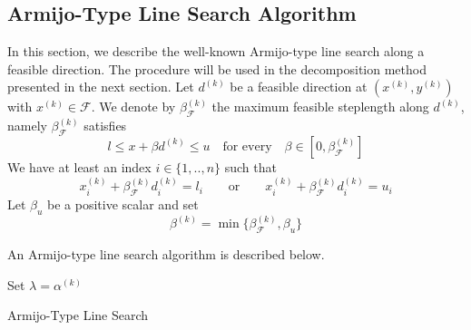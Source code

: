 \subsection{Armijo-Type Line Search Algorithm}
In this section, we describe the well-known Armijo-type line search along a feasible direction. The procedure will be used in the decomposition method presented in the next section. Let $d^{(k)}$ be a feasible direction at $(x^{(k)}, y^{(k)})$ with $x^{(k)} \in \mathcal{F}$. We denote by $\beta_{\mathcal{F}}^{(k)}$ the maximum feasible steplength along $d^{(k)}$, namely $\beta_{\mathcal{F}}^{(k)}$ satisfies
\begin{equation*}
l \leq x + \beta d^{(k)} \leq u \quad \text{for every} \quad \beta \in [ 0, \beta_{\mathcal{F}}^{(k)} ]
\end{equation*}
We have at least an index $i \in \{1, .., n\}$ such that
\begin{equation*}
x_i^{(k)} + \beta_{\mathcal{F}}^{(k)} d_i^{(k)} = l_i \qquad \text{or} \qquad x_i^{(k)} + \beta_{\mathcal{F}}^{(k)} d_i^{(k)} = u_i 
\end{equation*}
Let $\beta_u$ be a positive scalar and set
\begin{equation}
\beta^{(k)} = \min \{\beta_{\mathcal{F}}^{(k)}, \beta_u\}
\end{equation}

\hspace{-1.8em}An Armijo-type line search algorithm is described below.\\
\begin{algorithm}
 Set $\lambda = \alpha^{(k)}$\\
 \caption{Armijo-Type Line Search}
\end{algorithm}

